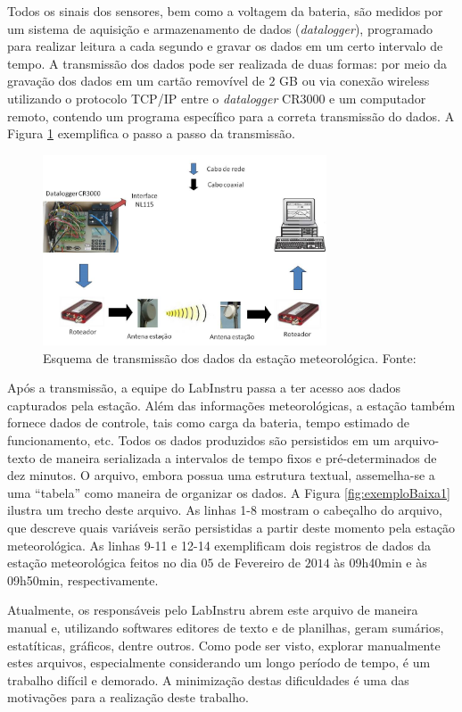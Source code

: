 Todos os sinais dos sensores, bem como a voltagem da bateria, são medidos por um sistema de aquisição e armazenamento de dados (\emph{datalogger}), programado para realizar leitura a cada segundo e gravar os dados em um certo intervalo de tempo. A transmissão dos dados pode ser realizada de duas formas: por meio da gravação dos dados em um cartão removível de $2$ GB ou via conexão wireless utilizando o protocolo TCP/IP entre o \emph{datalogger} CR3000 e um computador remoto, contendo um programa específico para a correta transmissão do dados. A Figura \ref{fig:ema4} exemplifica o passo a passo da transmissão.

\begin{figure}[H]
	\centering
	\includegraphics[width=0.75\textwidth]{./img/ema4.png}
	\caption{Esquema de transmissão dos dados da estação meteorológica. Fonte: \cite{Labinstru:EST}} \label{fig:ema4}
\end{figure}

Após a transmissão, a equipe do LabInstru passa a ter acesso aos dados capturados pela estação.  Além das informações meteorológicas, a estação também fornece dados de controle, tais como carga da bateria, tempo estimado de funcionamento, etc. Todos os dados produzidos são persistidos em um arquivo-texto de maneira serializada a intervalos de tempo fixos e pré-determinados de dez minutos. O arquivo, embora possua uma estrutura textual, assemelha-se a uma ``tabela'' como maneira de organizar os dados. A Figura \ref{fig:exemploBaixa1} ilustra um trecho deste arquivo. As linhas 1-8 mostram o cabeçalho do arquivo, que descreve quais variáveis serão persistidas a partir deste momento pela estação meteorológica. As linhas 9-11 e 12-14 exemplificam dois registros de dados da estação meteorológica feitos no dia $05$ de Fevereiro de $2014$ às 09h40min e às 09h50min, respectivamente.

Atualmente, os responsáveis pelo LabInstru abrem este arquivo de maneira manual e, utilizando softwares editores de texto e de planilhas, geram sumários, estatíticas, gráficos, dentre outros. Como pode ser visto, explorar manualmente estes arquivos, especialmente considerando um longo período de tempo, é um trabalho difícil e demorado. A minimização destas dificuldades é uma das motivações para a realização deste trabalho.

